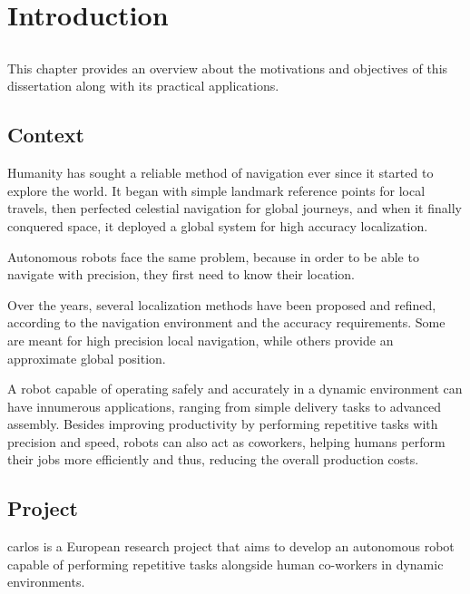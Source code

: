 \chapter{Introduction} \label{chap:introduction}



\section*{}

This chapter provides an overview about the motivations and objectives of this dissertation along with its practical applications.



\section{Context} \label{sec:introduction_context}

Humanity has sought a reliable method of navigation ever since it started to explore the world. It began with simple landmark reference points for local travels, then perfected celestial navigation for global journeys, and when it finally conquered space, it deployed a global system for high accuracy localization.

Autonomous robots face the same problem, because in order to be able to navigate with precision, they first need to know their location.

Over the years, several localization methods have been proposed and refined, according to the navigation environment and the accuracy requirements. Some are meant for high precision local navigation, while others provide an approximate global position.

A robot capable of operating safely and accurately in a dynamic environment can have innumerous applications, ranging from simple delivery tasks to advanced assembly. Besides improving productivity by performing repetitive tasks with precision and speed, robots can also act as coworkers, helping humans perform their jobs more efficiently and thus, reducing the overall production costs.



\section{Project} \label{sec:introduction_project}

\gls{carlos} is a European research project that aims to develop an autonomous robot capable of performing repetitive tasks alongside human co-workers in dynamic environments.

